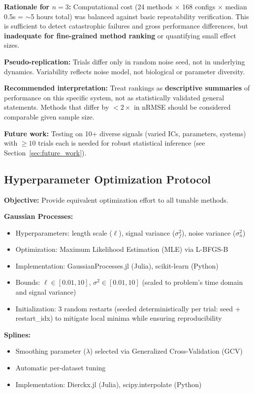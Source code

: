 \textbf{Rationale for $n=3$:} Computational cost (24 methods $\times$ 168 configs $\times$ median 0.5s = $\sim$5 hours total) was balanced against basic repeatability verification. This is sufficient to detect catastrophic failures and gross performance differences, but \textbf{inadequate for fine-grained method ranking} or quantifying small effect sizes.

\textbf{Pseudo-replication:} Trials differ only in random noise seed, not in underlying dynamics. Variability reflects noise model, not biological or parameter diversity.

\textbf{Recommended interpretation:} Treat rankings as \textbf{descriptive summaries} of performance on this specific system, not as statistically validated general statements. Methods that differ by $<2\times$ in nRMSE should be considered comparable given sample size.

\textbf{Future work:} Testing on 10+ diverse signals (varied ICs, parameters, systems) with $\geq 10$ trials each is needed for robust statistical inference (see Section~\ref{sec:future_work}).

\subsection{Hyperparameter Optimization Protocol}
\label{sec:hyperparameters}

\textbf{Objective:} Provide equivalent optimization effort to all tunable methods.

\textbf{Gaussian Processes:}
\begin{itemize}
    \item Hyperparameters: length scale ($\ell$), signal variance ($\sigma^2_f$), noise variance ($\sigma^2_n$)
    \item Optimization: Maximum Likelihood Estimation (MLE) via L-BFGS-B
    \item Implementation: GaussianProcesses.jl (Julia), scikit-learn (Python)
    \item Bounds: $\ell \in [0.01, 10]$, $\sigma^2 \in [0.01, 10]$ (scaled to problem's time domain and signal variance)
    \item Initialization: 3 random restarts (seeded deterministically per trial: seed + restart\_idx) to mitigate local minima while ensuring reproducibility
\end{itemize}

\textbf{Splines:}
\begin{itemize}
    \item Smoothing parameter ($\lambda$) selected via Generalized Cross-Validation (GCV)
    \item Automatic per-dataset tuning
    \item Implementation: Dierckx.jl (Julia), scipy.interpolate (Python)
\end{itemize}

